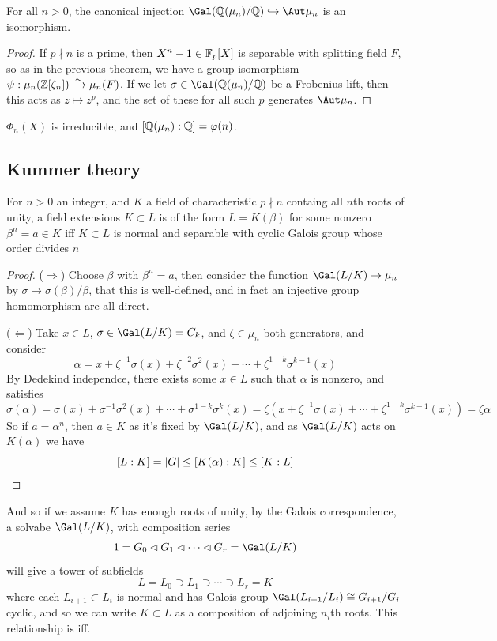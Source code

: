 \documentclass{article}
\begin{document}
\begin{theorem}
    For all $n>0$, the canonical injection $\Gal(\bQ(\mu_n)/\bQ)\hookrightarrow \Aut\mu_n$ is an isomorphism.
    \begin{proof}
        If $p\nmid n$ is a prime, then $X^n-1\in\mathbb{F}_p[X]$ is separable with splitting field $F$, so as in the previous theorem, we have a group isomorphism $\psi:\mu_n(\mathbb{Z}[\zeta_n])\xrightarrow{\sim} \mu_n(F)$. If we let $\sigma\in \Gal(\bQ(\mu_n)/\bQ)$ be a Frobenius lift, then this acts as $z\mapsto z^p$, and the set of these for all such $p$ generates $\Aut\mu_n$.
    \end{proof}
\end{theorem}

\begin{corollary}
    $\Phi_n(X)$ is irreducible, and $[\mathbb{Q}(\mu_n):\mathbb{Q}] = \varphi(n)$.
\end{corollary}

\subsection{Kummer theory}

\begin{theorem}
    For $n>0$ an integer, and $K$ a field of characteristic $p\nmid n$ containg all $n$th roots of unity, a field extensions $K\subset L$ is of the form $L=K(\beta)$ for some nonzero $\beta^n=a\in K$ iff $K\subset L$ is normal and separable with cyclic Galois group whose order divides $n$
    \begin{proof}
        ($\Rightarrow$) Choose $\beta$ with $\beta^n=a$, then consider the function $\Gal(L/K)\rightarrow \mu_n$ by $\sigma\mapsto \sigma(\beta)/\beta$, that this is well-defined, and in fact an injective group homomorphism are all direct.

        ($\Leftarrow$) Take $x\in L$, $\sigma\in \Gal(L/K)=C_k$, and $\zeta\in\mu_n$ both generators, and consider \[
            \alpha = x + \zeta^{-1}\sigma(x) + \zeta^{-2}\sigma^2(x) + \cdots + \zeta^{1-k}\sigma^{k-1}(x)
        \] By Dedekind independce, there exists some $x\in L$ such that $\alpha$ is nonzero, and satisfies \[
        \sigma(\alpha) = \sigma(x) + \sigma^{-1}\sigma^2(x) + \cdots + \sigma^{1-k}\sigma^k(x) = \zeta(x + \zeta^{-1}\sigma(x) + \cdots + \zeta^{1-k}\sigma^{k-1}(x)) = \zeta\alpha
        \] So if $a = \alpha^n$, then $a\in K$ as it's fixed by $\Gal(L/K)$, and as $\Gal(L/K)$ acts on $K(\alpha)$ we have \[
        [L:K] = \left| G \right| \leq [K(\alpha):K] \leq [K:L]\qedhere
        \]
    \end{proof}
\end{theorem}
And so if we assume $K$ has enough roots of unity, by the Galois correspondence, a solvabe $\Gal(L/K)$, with composition series \[
1 = G_0 \lhd G_1 \lhd \cdots \lhd G_r = \Gal(L/K)
\] will give a tower of subfields \[
L = L_0 \supset L_1 \supset \cdots \supset L_r = K
\] where each $L_{i+1}\subset L_i$ is normal and has Galois group $\Gal(L_{i+1}/L_i) \cong G_{i+1}/G_i$ cyclic, and so we can write $K\subset L$ as a composition of adjoining $n_i$th roots. This relationship is iff.
\end{document}
